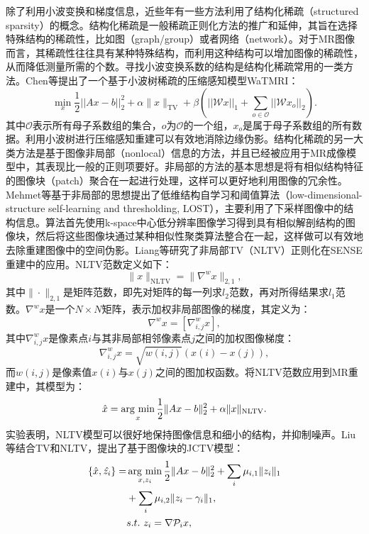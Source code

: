 除了利用小波变换和梯度信息，近些年有一些方法利用了结构化稀疏（structured sparsity）的概念。结构化稀疏是一般稀疏正则化方法的推广和延伸，其旨在选择特殊结构的稀疏性，比如图（graph/group）或者网络（network）。对于MR图像而言，其稀疏性往往具有某种特殊结构，而利用这种结构可以增加图像的稀疏性，从而降低测量所需的个数。寻找小波变换系数的结构是结构化稀疏常用的一类方法。Chen等提出了一个基于小波树稀疏的压缩感知模型WaTMRI\cite{tree,chen2014exploiting}：
\begin{equation}
	\min_x\frac{1}{2}||Ax-b||^2_2+\alpha \|x\|_\mathrm{TV} + \beta (||\mathcal{W}x||_1 + \sum_{o\in \mathscr{O}}||\mathcal{W}x_o||_2).
\end{equation}
其中$\mathscr{O}$表示所有母子系数组的集合，$o$为$\mathscr{O}$的一个组，$x_o$是属于母子系数组的所有数据。利用小波树进行压缩感知重建可以有效地消除边缘伪影。结构化稀疏的另一大类方法是基于图像非局部（nonlocal）\cite{peyre2008non,lou2010image,gilboa2008nonlocal}信息的方法，并且已经被应用于MR成像模型中，其表现比一般的正则项要好。非局部的方法的基本思想是将有相似结构特征的图像块（patch）聚合在一起进行处理，这样可以更好地利用图像的冗余性。Mehmet等\cite{akccakaya2011low}基于非局部的思想提出了低维结构自学习和阈值算法（low-dimensional-structure self-learning and thresholding, LOST），主要利用了下采样图像中的结构信息。算法首先使用k-space中心低分辨率图像学习得到具有相似解剖结构的图像块，然后将这些图像块通过某种相似性聚类算法整合在一起，这样做可以有效地去除重建图像中的空间伪影。Liang等\cite{liang2011sensitivity}研究了非局部TV（NLTV）正则化在SENSE重建中的应用。NLTV范数定义如下：
$$\|x\|_{\mathrm{NLTV}}=\|\nabla^wx\|_{2,1},$$
其中$\|\cdot\|_{2,1}$是矩阵范数，即先对矩阵的每一列求$l_2$范数，再对所得结果求$l_1$范数。$\nabla^wx$是一个$N\times N$矩阵，表示加权非局部图像的梯度，其定义为：
$$\nabla^wx=[\nabla^w_{i,j}x],$$
其中$\nabla^w_{i,j}x$是像素点$i$与其非局部相邻像素点$j$之间的加权图像梯度：
$$\nabla^w_{i,j}x=\sqrt{w(i,j)}(x(i)-x(j)),$$
而$w(i,j)$是像素值$x(i)$与$x(j)$之间的图加权函数。将NLTV范数应用到MR重建中，其模型为：
\begin{equation}
	\hat{x}=\argmin_x \frac{1}{2}\|Ax-b\|^2_2+\alpha\|x\|_{\mathrm{NLTV}}.
\end{equation}
实验表明，NLTV模型可以很好地保持图像信息和细小的结构，并抑制噪声。Liu\cite{liu2017mri}等结合TV和NLTV，提出了基于图像块的JCTV模型：
\begin{equation}
\begin{aligned}
	\{\hat{x},\hat{z_i}\}=&\argmin_{x,z_i}\frac{1}{2}\|Ax-b\|_2^2+\sum_i\mu_{i,1}\|z_i\|_1\\
	&+\sum_i\mu_{i,2}\|z_i-\gamma_i\|_1,\\
	&s.t.\ z_i=\nabla\mathcal{P}_ix,
\end{aligned}
\end{equation}
